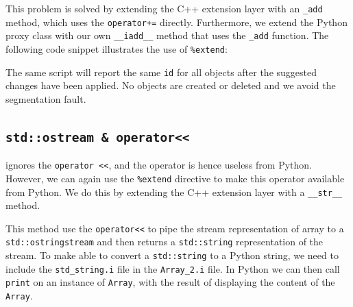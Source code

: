 This problem is solved by extending the C++ extension layer with an \texttt{\_add} method, which uses the \texttt{operator+=} directly. Furthermore, we extend the Python proxy class with our own \texttt{\_\_iadd\_\_} method that uses the \texttt{\_add} function. The following code snippet illustrates the use of \texttt{\%extend}:
The same script will report the same \texttt{id} for all objects after the suggested changes have been applied. No objects are created or deleted and we avoid the segmentation fault.\par

\subsection{ \texttt{std::ostream \& operator<<}}%
\swig ignores the \texttt{operator <<}, %
and the operator is hence useless from Python. However, we can again use the \texttt{\%extend} directive to make this operator available from Python. We do this by extending the C++ extension layer with a \texttt{\_\_str\_\_} method.
This method use the \texttt{operator<<} %
to pipe the stream representation of array to a \texttt{std::ostringstream} and then returns a \texttt{std::string} representation of the stream. To make \swig able to convert a \texttt{std::string} to a Python string, we need to include the \texttt{std\_string.i} file in the \texttt{Array\_2.i} file. In Python we can then call \texttt{print} on an instance of \texttt{Array}, with the result of displaying the content of the \texttt{Array}.\par

